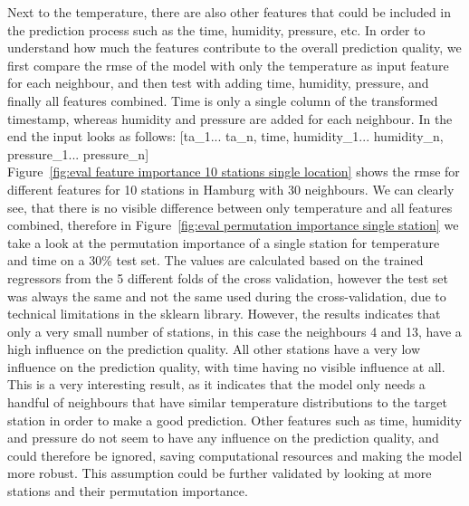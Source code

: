 Next to the temperature, there are also other features that could be included in the prediction process such as the time, humidity, pressure, etc. In order to understand how much the features contribute to the overall prediction quality, we first compare the \gls{rmse} of the model with only the temperature as input feature for each neighbour, and then test with adding time, humidity, pressure, and finally all features combined. Time is only a single column of the transformed timestamp, whereas humidity and pressure are added for each neighbour. In the end the input looks as follows: [ta\_1... ta\_n, time, humidity\_1... humidity\_n, pressure\_1... pressure\_n]\\
Figure~\ref{fig:eval feature importance 10 stations single location} shows the \gls{rmse} for different features for 10 stations in Hamburg with 30 neighbours. We can clearly see, that there is no visible difference between only temperature and all features combined, therefore in Figure~\ref{fig:eval permutation importance single station} we take a look at the permutation importance of a single station for temperature and time on a 30\% test set. The values are calculated based on the trained regressors from the 5 different folds of the cross validation, however the test set was always the same and not the same used during the cross-validation, due to technical limitations in the sklearn library. However, the results indicates that only a very small number of stations, in this case the neighbours 4 and 13, have a high influence on the prediction quality. All other stations have a very low influence on the prediction quality, with time having no visible influence at all. This is a very interesting result, as it indicates that the model only needs a handful of neighbours that have similar temperature distributions to the target station in order to make a good prediction. Other features such as time, humidity and pressure do not seem to have any influence on the prediction quality, and could therefore be ignored, saving computational resources and making the model more robust. This assumption could be further validated by looking at more stations and their permutation importance.\\ 

